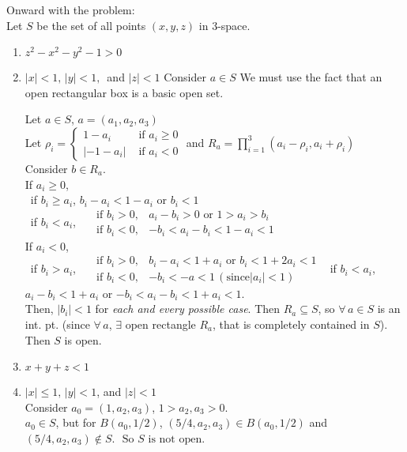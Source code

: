 \documentclass[twoside]{amsart}
\theoremstyle{plain}
\theoremstyle{definition}
\begin{document}
Onward with the problem:  \\

Let $S$ be the set of all points $(x,y,z)$ in 3-space.  \begin{enumerate}
\item $z^2 - x^2 - y^2 - 1 > 0 $
\item $ |x| < 1, \, |y| <1 , \, $ and $|z| < 1$ Consider $a \in S$
We must use the fact that an open rectangular box is a basic open set.  

Let $a \in S$, $a = (a_1,a_2,a_3)$ \\
Let $\rho_i = \begin{cases} 1 - a_i & \text{ if } a_i \geq 0 \\ |-1-a_i| & \text{ if } a_i < 0 \end{cases}$ and $R_a = \prod_{i=1}^3 (a_i - \rho_i, a_i + \rho_i)$  \\

Consider $b \in R_a$.  \\

If $a_i \geq 0$,  \\
\quad \, if $b_i \geq a_i$, $b_i - a_i < 1 - a_i$ or $b_i < 1$ \\
\quad \, if $b_i < a_i$, $\begin{aligned} & \text{ if } b_i > 0, & a_i - b_i > 0 \text{ or } 1 > a_i > b_i \\
  & \text{ if } b_i < 0, & -b_i < a_i - b_i < 1 - a_i < 1 \end{aligned}$ \\

If $a_i < 0$, \\
\quad \, if $b_i > a_i$, $\begin{aligned} & \text{ if } b_i > 0, & b_i - a_i < 1 +  a_i \text{ or } b_i < 1 + 2a_i < 1 \\
  & \text{ if } b_i < 0, & -b_i < -a < 1 \, (\text{since} |a_i|<1) \end{aligned}$
\quad \, if $b_i < a_i$, $a_i - b_i < 1+a_i$ or $-b_i < a_i -b_i < 1 + a_i <1$. \\

Then, $\boxed{ |b_i|<1 }$ for \emph{each and every possible case}.  Then $R_a \subseteq S$, so $\forall \, a \in S$ is an int. pt. (since $\forall \, a$, $\exists$ open rectangle $R_a$, that is completely contained in $S$).  Then $S$ is open.  

\item $x+y+z < 1$
\item $|x| \leq 1, \, |y| < 1$, and $|z| < 1$  \medskip \\
Consider $a_0 = (1,a_2,a_3)$, $1 > a_2,a_3 > 0$.  \\
$a_0 \in S$, but for $B(a_0,1/2)$, $(5/4,a_2,a_3) \in B(a_0,1/2)$ and $(5/4,a_2,a_3) \notin S$.  $\boxed{ \text{ So $S$ is not open. }}$   \\


\end{enumerate}
\end{document}
